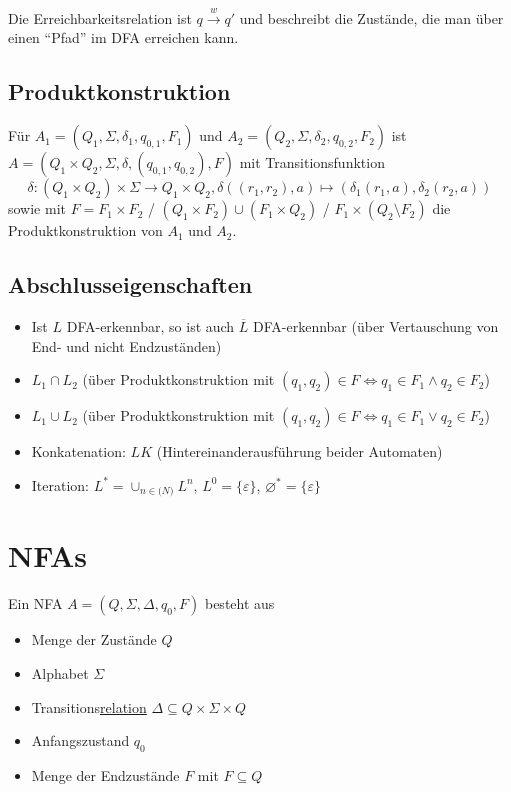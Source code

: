 \documentclass[11pt]{scrartcl}
\begin{document}
Die Erreichbarkeitsrelation ist $q \stackrel{w}{\to} q'$ und beschreibt die Zustände, die man über einen ``Pfad'' im DFA erreichen kann.

\subsection{Produktkonstruktion}
Für $A_1 = (Q_1, \Sigma, \delta_1, q_{0,1}, F_1)$ und $A_2 = (Q_2, \Sigma, \delta_2, q_{0,2}, F_2)$ ist
$A = (Q_1 \times Q_2,\Sigma, \delta, (q_{0,1},q_{0,2}), F)$ mit Transitionsfunktion
$$\delta:(Q_1 \times Q_2)\times \Sigma \to Q_1 \times Q_2,\delta((r_1,r_2),a) \mapsto (\delta_1(r_1,a),\delta_2(r_2,a))$$ sowie mit $F=F_1 \times F_2$ / $(Q_1 \times F_2)\cup(F_1 \times Q_2)$ / $F_1 \times (Q_2 \setminus F_2)$ die Produktkonstruktion von $A_1$ und $A_2$.

\subsection{Abschlusseigenschaften}
\begin{itemize}
    \item Ist $L$ DFA-erkennbar, so ist auch $\overline{L}$ DFA-erkennbar (über Vertauschung von End- und nicht Endzuständen)
	\item{$L_1 \cap L_2$ (über Produktkonstruktion mit $(q_1, q_2) \in F \Leftrightarrow q_1 \in F_1 \land q_2 \in F_2$)}
	\item{$L_1 \cup L_2$ (über Produktkonstruktion mit $(q_1, q_2) \in F \Leftrightarrow q_1 \in F_1 \lor q_2 \in F_2$)}
	\item{Konkatenation: $LK$ (Hintereinanderausführung beider Automaten)}
	\item{Iteration: $L^*=\cup_{n \in \mathbb(N)} L^n$, $L^0=\{\varepsilon\}$, $\varnothing^*=\{\varepsilon\}$}
\end{itemize}

\section{NFAs}
Ein NFA $A = (Q, \Sigma, \Delta, q_0, F)$ besteht aus
\begin{itemize}
	\item Menge der Zustände $Q$
    \item Alphabet $\Sigma$
    \item Transitions\underline{relation} $\Delta \subseteq Q \times \Sigma \times Q$
    \item Anfangszustand $q_0$
    \item Menge der Endzustände $F$ mit $F \subseteq Q$
\end{itemize}
\end{document}
